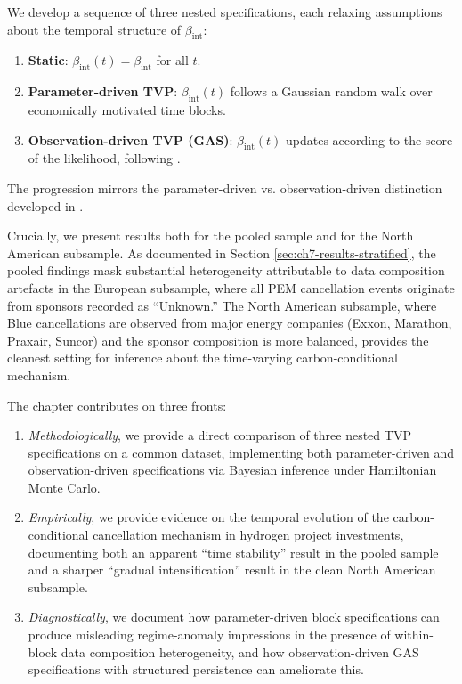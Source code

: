 \documentclass[11pt,a4paper]{article}
\newcommand{\bint}{\beta_{\mathrm{int}}}
\begin{document}
We develop a sequence of three nested specifications, each relaxing assumptions about the temporal structure of $\bint$:
\begin{enumerate}
    \item[(M1)] \textbf{Static}: $\bint(t) = \bint$ for all $t$.
    \item[(M2)] \textbf{Parameter-driven TVP}: $\bint(t)$ follows a Gaussian random walk over economically motivated time blocks.
    \item[(M3)] \textbf{Observation-driven TVP (GAS)}: $\bint(t)$ updates according to the score of the likelihood, following \citet{creal2008general, creal2013generalized}.
\end{enumerate}
The progression mirrors the parameter-driven vs. observation-driven distinction developed in \citet{koopman2016predicting}.

Crucially, we present results both for the pooled sample and for the North American subsample. As documented in Section \ref{sec:ch7-results-stratified}, the pooled findings mask substantial heterogeneity attributable to data composition artefacts in the European subsample, where all PEM cancellation events originate from sponsors recorded as ``Unknown.'' The North American subsample, where Blue cancellations are observed from major energy companies (Exxon, Marathon, Praxair, Suncor) and the sponsor composition is more balanced, provides the cleanest setting for inference about the time-varying carbon-conditional mechanism.

The chapter contributes on three fronts:
\begin{enumerate}
    \item \textit{Methodologically}, we provide a direct comparison of three nested TVP specifications on a common dataset, implementing both parameter-driven and observation-driven specifications via Bayesian inference under Hamiltonian Monte Carlo.
    \item \textit{Empirically}, we provide evidence on the temporal evolution of the carbon-conditional cancellation mechanism in hydrogen project investments, documenting both an apparent ``time stability'' result in the pooled sample and a sharper ``gradual intensification'' result in the clean North American subsample.
    \item \textit{Diagnostically}, we document how parameter-driven block specifications can produce misleading regime-anomaly impressions in the presence of within-block data composition heterogeneity, and how observation-driven GAS specifications with structured persistence can ameliorate this.
\end{enumerate}
\end{document}
